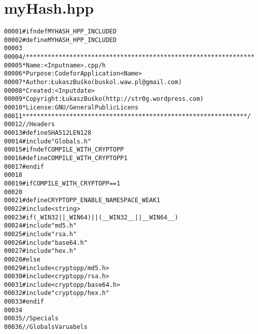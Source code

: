 \hypertarget{myHash_8hpp_source}{
\section{myHash.hpp}
}


\begin{footnotesize}\begin{alltt}
00001 \textcolor{preprocessor}{#ifndef MYHASH\_HPP\_INCLUDED}
00002 \textcolor{preprocessor}{}\textcolor{preprocessor}{#define MYHASH\_HPP\_INCLUDED}
00003 \textcolor{preprocessor}{}
00004 \textcolor{comment}{/***************************************************************}
00005 \textcolor{comment}{ * Name:      <Input name>.cpp/h}
00006 \textcolor{comment}{ * Purpose:   Code for Application <Name>}
00007 \textcolor{comment}{ * Author:    Łukasz Buśko (buskol.waw.pl@gmail.com)}
00008 \textcolor{comment}{ * Created:   <Input date>}
00009 \textcolor{comment}{ * Copyright: Łukasz Buśko (http://str0g.wordpress.com)}
00010 \textcolor{comment}{ * License:   GNU / General Public Licens}
00011 \textcolor{comment}{ **************************************************************/}
00012 \textcolor{comment}{//Headers}
00013 \textcolor{preprocessor}{#define SHA512LEN 128}
00014 \textcolor{preprocessor}{}\textcolor{preprocessor}{#include "Globals.h"}
00015 \textcolor{preprocessor}{#ifndef COMPILE\_WITH\_CRYPTOPP}
00016 \textcolor{preprocessor}{}\textcolor{preprocessor}{    #define COMPILE\_WITH\_CRYPTOPP 1}
00017 \textcolor{preprocessor}{}\textcolor{preprocessor}{#endif}
00018 \textcolor{preprocessor}{}
00019 \textcolor{preprocessor}{#if COMPILE\_WITH\_CRYPTOPP == 1}
00020 \textcolor{preprocessor}{}
00021 \textcolor{preprocessor}{#define CRYPTOPP\_ENABLE\_NAMESPACE\_WEAK 1}
00022 \textcolor{preprocessor}{}\textcolor{preprocessor}{#include <string>}
00023 \textcolor{preprocessor}{#if ( \_WIN32 ||  \_WIN64) || ( \_\_WIN32\_\_ || \_\_WIN64\_\_ )}
00024 \textcolor{preprocessor}{}\textcolor{preprocessor}{    #include "md5.h"}
00025 \textcolor{preprocessor}{    #include "rsa.h"}
00026 \textcolor{preprocessor}{    #include "base64.h"}
00027 \textcolor{preprocessor}{    #include "hex.h"}
00028 \textcolor{preprocessor}{#else}
00029 \textcolor{preprocessor}{}\textcolor{preprocessor}{    #include <cryptopp/md5.h>}
00030 \textcolor{preprocessor}{    #include <cryptopp/rsa.h>}
00031 \textcolor{preprocessor}{    #include <cryptopp/base64.h>}
00032 \textcolor{preprocessor}{    #include "cryptopp/hex.h"}
00033 \textcolor{preprocessor}{#endif}
00034 \textcolor{preprocessor}{}
00035 \textcolor{comment}{//Specials}
00036 \textcolor{comment}{//Globals Varuabels}

\end{alltt}
\end{footnotesize}
